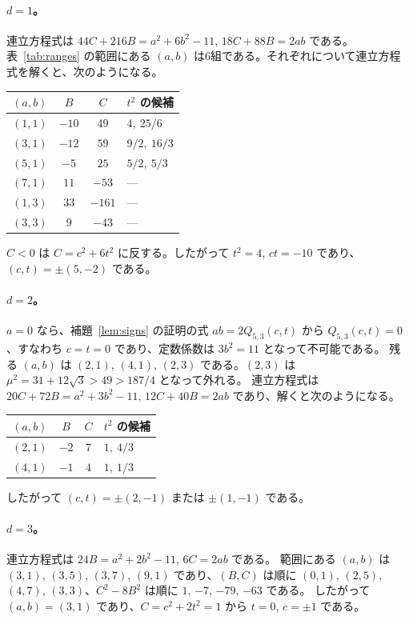\documentclass[a4paper,11pt]{ltjsarticle}
\theoremstyle{jplain}
\numberwithin{equation}{section}
\numberwithin{table}{section}
\begin{document}
\paragraph{$d=1$。}
連立方程式は $44C+216B=a^2+6b^2-11$, $18C+88B=2ab$ である。
表~\ref{tab:ranges} の範囲にある $(a,b)$ は6組である。それぞれについて連立方程式を解くと、次のようになる。
\begin{center}
\begin{tabular}{cccl}
\toprule
$(a,b)$ & $B$ & $C$ & $t^2$ の候補\\
\midrule
$(1,1)$ & $-10$ & $49$ & $4,\ 25/6$\\
$(3,1)$ & $-12$ & $59$ & $9/2,\ 16/3$\\
$(5,1)$ & $-5$ & $25$ & $5/2,\ 5/3$\\
$(7,1)$ & $11$ & $-53$ & —\\
$(1,3)$ & $33$ & $-161$ & —\\
$(3,3)$ & $9$ & $-43$ & —\\
\bottomrule
\end{tabular}
\end{center}
$C<0$ は $C=c^2+6t^2$ に反する。したがって $t^2=4$, $ct=-10$ であり、$(c,t)=\pm(5,-2)$ である。

\paragraph{$d=2$。}
$a=0$ なら、補題~\ref{lem:signs} の証明の式 $ab=2Q_{5,3}(c,t)$ から $Q_{5,3}(c,t)=0$、すなわち $c=t=0$ であり、定数係数は $3b^2=11$ となって不可能である。
残る $(a,b)$ は $(2,1)$, $(4,1)$, $(2,3)$ である。$(2,3)$ は $\mu^2=31+12\sqrt3>49>187/4$ となって外れる。
連立方程式は $20C+72B=a^2+3b^2-11$, $12C+40B=2ab$ であり、解くと次のようになる。
\begin{center}
\begin{tabular}{cccl}
\toprule
$(a,b)$ & $B$ & $C$ & $t^2$ の候補\\
\midrule
$(2,1)$ & $-2$ & $7$ & $1,\ 4/3$\\
$(4,1)$ & $-1$ & $4$ & $1,\ 1/3$\\
\bottomrule
\end{tabular}
\end{center}
したがって $(c,t)=\pm(2,-1)$ または $\pm(1,-1)$ である。

\paragraph{$d=3$。}
連立方程式は $24B=a^2+2b^2-11$, $6C=2ab$ である。
範囲にある $(a,b)$ は $(3,1)$, $(3,5)$, $(3,7)$, $(9,1)$ であり、$(B,C)$ は順に $(0,1)$, $(2,5)$, $(4,7)$, $(3,3)$、$C^2-8B^2$ は順に $1$, $-7$, $-79$, $-63$ である。
したがって $(a,b)=(3,1)$ であり、$C=c^2+2t^2=1$ から $t=0$, $c=\pm1$ である。
\end{document}
